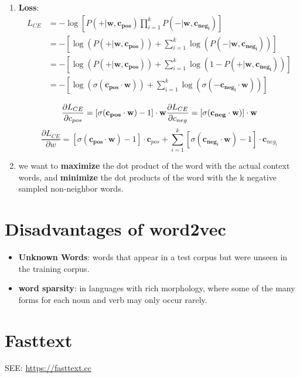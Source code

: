 \begin{enumerate}
    \item \textbf{Loss}:
    \begin{align*}
        L_{CE} 
        &= -\log\left[ P(+|\mathbf{w, c_{pos}}) \prod_{i=1}^{k} P(-|\mathbf{w, c_{neg_i}}) \right]\\ 
        &= -\left[ \log(P(+|\mathbf{w, c_{pos}})) + \sum_{i=1}^{k} \log(P(-|\mathbf{w, c_{neg_i}})) \right]\\ 
        &= -\left[ \log(P(+|\mathbf{w, c_{pos}})) + \sum_{i=1}^{k} \log(1-P(+|\mathbf{w, c_{neg_i}})) \right]\\ 
        &= -\left[ \log(\sigma(\mathbf{c_{pos}\cdot w})) + \sum_{i=1}^{k} \log(\sigma(\mathbf{-c_{neg_i}\cdot w})) \right]\\ 
    \end{align*}
    \[
        \displaystyle \frac{\partial L_{CE}}{\partial c_{pos}} = [\sigma(\mathbf{c_{pos}\cdot w})-1]\cdot \mathbf{w} \hfill \displaystyle \frac{\partial L_{CE}}{\partial c_{neg}} = [\sigma(\mathbf{c_{neg}\cdot w})]\cdot \mathbf{w}
    \]
    \[
        \displaystyle \frac{\partial L_{CE}}{\partial w} = [\sigma(\mathbf{c_{pos}\cdot w})-1]\cdot \mathbf{c}_{pos} + \sum_{i=1}^{k}[\sigma(\mathbf{c_{neg_i}\cdot w})-1]\cdot \mathbf{c}_{neg_i}
    \]


    \item we want to \textbf{maximize} the dot product of the word with the actual context words, and \textbf{minimize} the dot products of the word with the k negative sampled non-neighbor words.

    
    
\end{enumerate}

\section*{Disadvantages of word2vec \cite{nlp-1}}
\begin{itemize}
    \item \textbf{Unknown Words}: words that appear in a test corpus but were unseen in the training corpus.

    \item \textbf{word sparsity}: in languages with rich morphology, where some of the many forms for each noun and verb may only occur rarely.
\end{itemize}

\section{Fasttext \cite{nlp-1}}\label{Fasttext}
SEE: \url{https://fasttext.cc}

